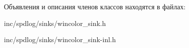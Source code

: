 Объявления и описания членов классов находятся в файлах\+:\begin{DoxyCompactItemize}
\item 
inc/spdlog/sinks/wincolor\+\_\+sink.\+h\item 
inc/spdlog/sinks/wincolor\+\_\+sink-\/inl.\+h\end{DoxyCompactItemize}
